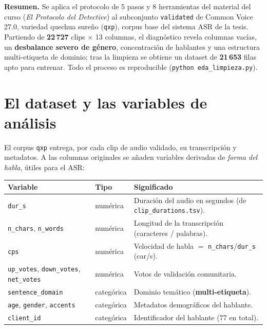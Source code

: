 \documentclass[11pt,a4paper]{article}
\begin{document}
\thispagestyle{empty}
\tableofcontents
\clearpage
\setcounter{page}{1}

\vspace{-0.2cm}

\noindent\colorbox{g4!22}{\parbox{\linewidth}{\small
\textbf{Resumen.} Se aplica el protocolo de 5 pasos y 8 herramientas del material del curso
(\emph{El Protocolo del Detective}) al subconjunto \texttt{validated} de Common Voice 27.0, variedad
quechua sureño (\texttt{qxp}), corpus base del sistema ASR de la tesis. Partiendo de
\textbf{22\,727} clips $\times$ 13 columnas, el diagnóstico revela columnas vacías, un
\textbf{desbalance severo de género}, concentración de hablantes y una estructura multi-etiqueta de
dominio; tras la limpieza se obtiene un dataset de \textbf{21\,653} filas apto para entrenar. Todo el
proceso es reproducible (\texttt{python eda\_limpieza.py}).}}

\section{El dataset y las variables de análisis}
El corpus \texttt{qxp} entrega, por cada clip de audio validado, su transcripción y metadatos. A las
columnas originales se añaden variables derivadas de \emph{forma del habla}, útiles para el ASR:

\begin{center}\small
\begin{tabularx}{\linewidth}{@{}l l X@{}}
\toprule
\textbf{Variable} & \textbf{Tipo} & \textbf{Significado} \\
\midrule
\texttt{dur\_s} & numérica & Duración del audio en segundos (de \texttt{clip\_durations.tsv}). \\
\texttt{n\_chars}, \texttt{n\_words} & numérica & Longitud de la transcripción (caracteres / palabras). \\
\texttt{cps} & numérica & Velocidad de habla $=$ \texttt{n\_chars}/\texttt{dur\_s} (car/s). \\
\texttt{up\_votes}, \texttt{down\_votes}, \texttt{net\_votes} & numérica & Votos de validación comunitaria. \\
\texttt{sentence\_domain} & categórica & Dominio temático (\textbf{multi-etiqueta}). \\
\texttt{age}, \texttt{gender}, \texttt{accents} & categórica & Metadatos demográficos del hablante. \\
\texttt{client\_id} & categórica & Identificador del hablante (77 en total). \\
\bottomrule
\end{tabularx}
\end{center}
\end{document}
